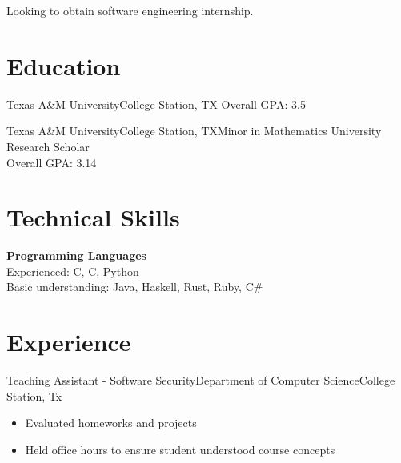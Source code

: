 \documentclass[11pt,a4paper,sans]{moderncv}
\newcommand{\Rplus}{\protect\hspace{-.1em}\protect\raisebox{.35ex}{\smaller{\smaller\textbf{+}}}}
\newcommand{\Cpp}{\mbox{C\Rplus\Rplus}\xspace}
\newcommand{\spacing}{2pt}
\begin{document}
\makecvtitle

\addvspace{-2em}

\small{Looking to obtain software engineering internship.}

\section{Education}

\vspace{\spacing}

    {Texas A\&M University}{College Station, TX}{}
    {Overall GPA: 3.5}

\vspace{\spacing}

    {Texas A\&M University}{College Station, TX}{Minor in Mathematics}
    {University Research Scholar \\ Overall GPA: 3.14}

\section{Technical Skills}

\vspace{\spacing}

\textbf{Programming Languages} \\
  Experienced: \Cpp, C, Python \\
  Basic understanding: Java, Haskell, Rust, Ruby, C\#

\section{Experience}

\vspace{\spacing}

  {Teaching Assistant - Software Security}{Department of Computer Science}{College Station, Tx}{}
    {\vspace{3pt}
    \begin{itemize}
      \setlength{\itemindent}{1em}
      \item Evaluated homeworks and projects 
      \item Held office hours to ensure student understood course concepts
    \end{itemize}
    }
\end{document}
